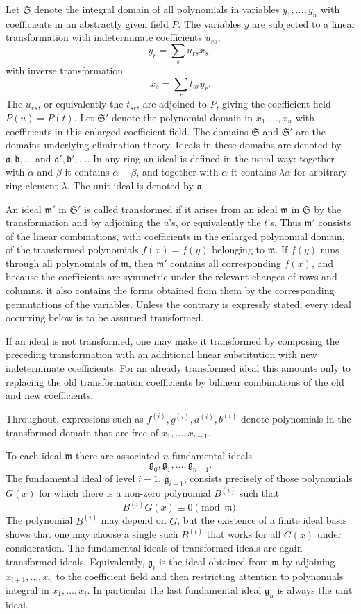 \documentclass[11pt]{article}
\begin{document}
Let $\mathfrak S$ denote the integral domain of all polynomials in variables $y_1,\ldots,y_n$ with coefficients in an abstractly given field $P$. The variables $y$ are subjected to a linear transformation with indeterminate coefficients $u_{rs}$,
\[
  y_r=\sum_s u_{rs}x_s,
\]
with inverse transformation
\[
  x_s=\sum_r t_{sr}y_r.
\]
The $u_{rs}$, or equivalently the $t_{sr}$, are adjoined to $P$, giving the coefficient field $P(u)=P(t)$. Let $\mathfrak S'$ denote the polynomial domain in $x_1,\ldots,x_n$ with coefficients in this enlarged coefficient field. The domains $\mathfrak S$ and $\mathfrak S'$ are the domains underlying elimination theory. Ideals in these domains are denoted by $\mathfrak a,\mathfrak b,\ldots$ and $\mathfrak a',\mathfrak b',\ldots$. In any ring an ideal is defined in the usual way: together with $\alpha$ and $\beta$ it contains $\alpha-\beta$, and together with $\alpha$ it contains $\lambda\alpha$ for arbitrary ring element $\lambda$. The unit ideal is denoted by $\mathfrak o$.

An ideal $\mathfrak m'$ in $\mathfrak S'$ is called transformed if it arises from an ideal $\mathfrak m$ in $\mathfrak S$ by the transformation and by adjoining the $u$'s, or equivalently the $t$'s. Thus $\mathfrak m'$ consists of the linear combinations, with coefficients in the enlarged polynomial domain, of the transformed polynomials $f(x)=f(y)$ belonging to $\mathfrak m$. If $f(y)$ runs through all polynomials of $\mathfrak m$, then $\mathfrak m'$ contains all corresponding $f(x)$, and because the coefficients are symmetric under the relevant changes of rows and columns, it also contains the forms obtained from them by the corresponding permutations of the variables. Unless the contrary is expressly stated, every ideal occurring below is to be assumed transformed.

If an ideal is not transformed, one may make it transformed by composing the preceding transformation with an additional linear substitution with new indeterminate coefficients. For an already transformed ideal this amounts only to replacing the old transformation coefficients by bilinear combinations of the old and new coefficients.

Throughout, expressions such as $f^{(i)},g^{(i)},a^{(i)},b^{(i)}$ denote polynomials in the transformed domain that are free of $x_1,\ldots,x_{i-1}$.

To each ideal $\mathfrak m$ there are associated $n$ fundamental ideals
\[
  \mathfrak g_0,\mathfrak g_1,\ldots,\mathfrak g_{n-1}.
\]
The fundamental ideal of level $i-1$, $\mathfrak g_{i-1}$, consists precisely of those polynomials $G(x)$ for which there is a non-zero polynomial $B^{(i)}$ such that
\[
  B^{(i)}G(x)\equiv 0 \pmod{\mathfrak m}.
\]
The polynomial $B^{(i)}$ may depend on $G$, but the existence of a finite ideal basis shows that one may choose a single such $B^{(i)}$ that works for all $G(x)$ under consideration. The fundamental ideals of transformed ideals are again transformed ideals. Equivalently, $\mathfrak g_i$ is the ideal obtained from $\mathfrak m$ by adjoining $x_{i+1},\ldots,x_n$ to the coefficient field and then restricting attention to polynomials integral in $x_1,\ldots,x_i$. In particular the last fundamental ideal $\mathfrak g_n$ is always the unit ideal.
\end{document}

